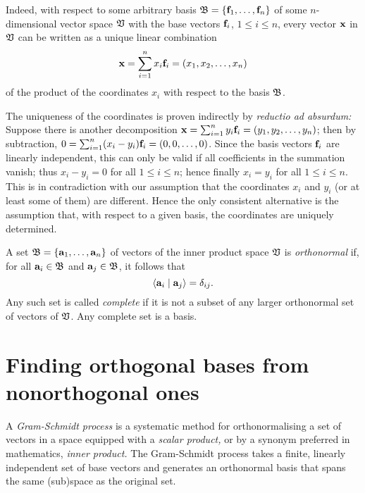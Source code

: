 Indeed, with respect to some arbitrary  basis ${\frak B}=\{
{\bf f}_1, \ldots , {\bf f}_n\}$ of some $n$-dimensional vector space ${\frak V}$
with the base vectors ${\bf f}_i$, $1\le i\le n$, every vector ${\bf x}$ in  ${\frak V}$
can be written as a unique linear combination
\begin{equation}
{\bf x} = \sum_{i=1}^n x_i{\bf f}_i = (x_1,x_2, \ldots , x_n)
\end{equation}
of the product of the coordinates $x_i$ with respect to the basis  ${\frak B}$.

{\color{OliveGreen}
\bproof
The uniqueness of the coordinates is proven indirectly by {\em reductio ad absurdum:}
Suppose there is another decomposition
${\bf x} = \sum_{i=1}^n y_i{\bf f}_i = (y_1,y_2, \ldots , y_n) $;
then by subtraction, $0 = \sum_{i=1}^n (x_i-y_i) {\bf f}_i = (0,0, \ldots , 0)$.
Since the basis vectors ${\bf f}_i$ are linearly independent,
this can only be valid if all coefficients in the summation  vanish;
thus $x_i-y_i=0$ for all $1\le i\le n$; hence finally  $x_i=y_i$ for all $1\le i\le n$.
This is in contradiction with our assumption that the coordinates $x_i$ and $y_i$
(or at least some of them) are different.
Hence the only consistent alternative is the assumption that, with respect to a given basis, the coordinates are uniquely determined.
\eproof
}

A  set    $\frak B = \{
{\bf a}_1, \ldots , {\bf a}_n\}$
of  vectors   of the inner product space $\frak V$
is {\em orthonormal}
if, for all
 ${\bf a}_i\in\frak B$ and
 ${\bf a}_j\in\frak B$,
it follows that
\begin{equation}
\langle {\bf a}_i \mid {\bf a}_j \rangle =\delta_{ij}.
\end{equation}
Any such set is called {\em complete}
if it is not a subset of any larger orthonormal set of vectors of $\frak V$.
Any complete set is a basis.


\section{Finding orthogonal bases from nonorthogonal ones}

A {\em Gram-Schmidt process} is a systematic method for orthonormalising a set of vectors
in a space equipped with a {\em scalar product,}
or by a synonym preferred in mathematics, {\em inner product.}
The Gram-Schmidt process takes a finite, linearly independent set
of base vectors
and generates an orthonormal basis that spans the same (sub)space as the original set.

